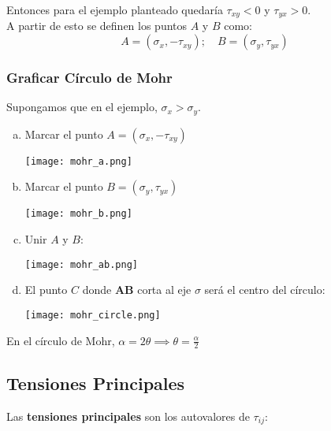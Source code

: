 \documentclass[a4paper,12pt,twoside,final,spanish]{article}
\begin{document}
Entonces para el ejemplo planteado quedaría $\tau_{xy}<0$ y $\tau_{yx}>0$.\\

A partir de esto se definen los puntos $A$ y $B$ como:
\[
A=(\sigma_{x},-\tau_{xy});\quad B=(\sigma_{y},\tau_{yx})
\]

\subsubsection*{Graficar Círculo de Mohr}

Supongamos que en el ejemplo, $\sigma_{x}>\sigma_{y}$.

\begin{enumerate}[a.]
\item Marcar el punto $A=(\sigma_{x},-\tau_{xy})$

\begin{center}
\texttt{[image: mohr\_a.png]}
\end{center}

\item Marcar el punto $B=(\sigma_{y},\tau_{yx})$

\begin{center}
\texttt{[image: mohr\_b.png]}
\end{center}

\item Unir $A$ y $B$:

\begin{center}
\texttt{[image: mohr\_ab.png]}
\end{center}

\item El punto $C$ donde $\mathbf{AB}$ corta al eje $\sigma$ será el centro del círculo:

\begin{center}
\texttt{[image: mohr\_circle.png]}
\end{center} 
\end{enumerate}

En el círculo de Mohr, $\alpha=2\theta\implies\theta=\frac{\alpha}{2}$

\subsection*{Tensiones Principales}

Las \textbf{tensiones principales} son los autovalores de $\tau_{ij}$:
\end{document}

